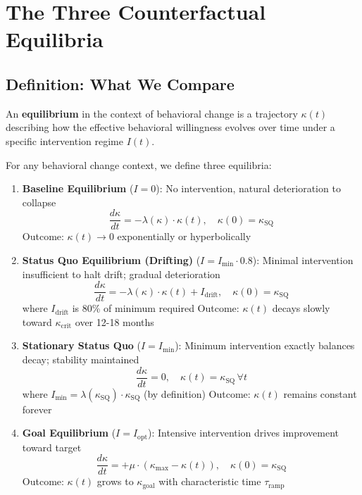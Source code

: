 \documentclass[11pt, a4paper]{article}
\begin{document}
\section{The Three Counterfactual Equilibria}

\subsection{Definition: What We Compare}

An \textbf{equilibrium} in the context of behavioral change is a trajectory $\kappa(t)$
describing how the effective behavioral willingness evolves over time under a specific
intervention regime $I(t)$.

\begin{definition}
For any behavioral change context, we define three equilibria:

\begin{enumerate}
    \item \textbf{Baseline Equilibrium} ($I = 0$):
    No intervention, natural deterioration to collapse
    $$\frac{d\kappa}{dt} = -\lambda(\kappa) \cdot \kappa(t), \quad \kappa(0) = \kappa_{\text{SQ}}$$
    Outcome: $\kappa(t) \to 0$ exponentially or hyperbolically

    \item \textbf{Status Quo Equilibrium (Drifting)} ($I = I_{\text{min}} \cdot 0.8$):
    Minimal intervention insufficient to halt drift; gradual deterioration
    $$\frac{d\kappa}{dt} = -\lambda(\kappa) \cdot \kappa(t) + I_{\text{drift}}, \quad \kappa(0) = \kappa_{\text{SQ}}$$
    where $I_{\text{drift}}$ is 80\% of minimum required
    Outcome: $\kappa(t)$ decays slowly toward $\kappa_{\text{crit}}$ over 12-18 months

    \item \textbf{Stationary Status Quo} ($I = I_{\text{min}}$):
    Minimum intervention exactly balances decay; stability maintained
    $$\frac{d\kappa}{dt} = 0, \quad \kappa(t) = \kappa_{\text{SQ}} \, \forall t$$
    where $I_{\text{min}} = \lambda(\kappa_{\text{SQ}}) \cdot \kappa_{\text{SQ}}$ (by definition)
    Outcome: $\kappa(t)$ remains constant forever

    \item \textbf{Goal Equilibrium} ($I = I_{\text{opt}}$):
    Intensive intervention drives improvement toward target
    $$\frac{d\kappa}{dt} = +\mu \cdot (\kappa_{\text{max}} - \kappa(t)), \quad \kappa(0) = \kappa_{\text{SQ}}$$
    Outcome: $\kappa(t)$ grows to $\kappa_{\text{goal}}$ with characteristic time $\tau_{\text{ramp}}$
\end{enumerate}
\end{definition}
\end{document}
